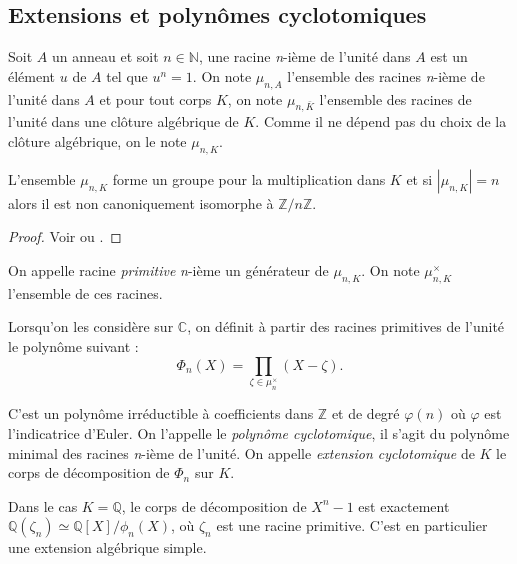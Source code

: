 \documentclass[a4paper]{article} %
\numberwithin{section}{part}
\numberwithin{equation}{section}
\newcommand\nroot[1]{\textit{#1}-ième}
\newcommand\zmodn[1]{\mathbb{Z}/#1\mathbb{Z}}
\newcommand\QQ{\mathbb{Q}}
\newcommand\ZZ{\mathbb{Z}}
\newcommand\NN{\mathbb{N}}
\newcommand\CC{\mathbb{C}}
\begin{document}
\subsection{Extensions et polynômes cyclotomiques}
Soit $A$ un anneau et soit $n\in\NN$, une racine \nroot{n} de l'unité dans $A$ 
est un élément $u$ de $A$ tel que $u^n = 1$. On note $\mu_{n,A}$ l'ensemble des 
racines \nroot{n} de l'unité dans $A$ et pour tout corps $K$, on note 
$\mu_{n,\bar{K}}$ l'ensemble des racines de l'unité dans une clôture algébrique 
de $K$. Comme il ne dépend pas du choix de la clôture algébrique, on le note 
$\mu_{n,K}$.\par

\begin{prop}
\label{prop:rootcycl}
L'ensemble $\mu_{n,K}$ forme un groupe pour la multiplication dans $K$ et si 
$|\mu_{n,K}| = n$ alors il est non canoniquement isomorphe à $\zmodn{n}$.
\end{prop}
\begin{proof}
Voir \cite[p. 28, th. 1]{Sam} ou \cite[qqch]{Lan1}.
\end{proof}

\begin{defn}
On appelle racine \emph{primitive} \nroot{n} un générateur de $\mu_{n,K}$. On 
note $\mu_{n,K}^{\times}$ l'ensemble de ces racines.
\end{defn}

Lorsqu'on les considère sur $\CC$, on définit à partir des racines primitives de
l'unité le polynôme suivant :
\begin{equation}
\Phi_n(X) = \prod_{\zeta\in \mu_n^{\times}}{(X - \zeta)}.
\end{equation}

C'est un polynôme irréductible à coefficients dans $\ZZ$ \cite[prop 4.8]{Per} et
de degré $\varphi(n)$ où $\varphi$ est l'indicatrice d'Euler. On l'appelle 
le \emph{polynôme cyclotomique}, il s'agit du polynôme minimal des racines
\nroot{n} de l'unité. On appelle \emph{extension cyclotomique} de $K$ le corps
de décomposition de $\Phi_n$ sur $K$.

\begin{rem}
Dans le cas $K = \QQ$, le corps de décomposition de $X^n - 1$ est exactement 
$\QQ(\zeta_n) \simeq \QQ[X]/\phi_n(X)$, où $\zeta_n$ est une racine primitive. 
C'est en particulier une extension algébrique simple.
\end{rem}
\end{document}
